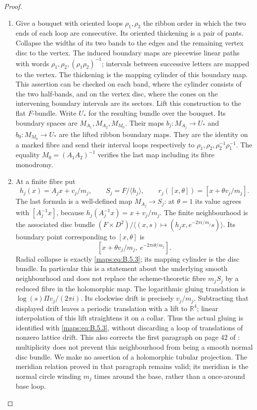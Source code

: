 \begin{proof}
\begin{enumerate}[label=\arabic*.,leftmargin=*]
\item Give a bouquet with oriented loops $\rho_1,\rho_2$ the ribbon
order in which the two ends of each loop are consecutive.
Its oriented thickening is a pair of pants.  Collapse the
widths of its two bands to the edges and the remaining
vertex disc to the vertex.  The induced boundary maps are
piecewise linear paths with words
$\rho_1,\rho_2,(\rho_1\rho_2)^{-1}$; intervals between
successive letters are mapped to the vertex.  The thickening
is the mapping cylinder of this boundary map.  This assertion
can be checked on each band, where the cylinder consists of
the two half-bands, and on the vertex disc, where the cones
on the intervening boundary intervals are its sectors.
Lift this construction to the flat $F$-bundle.  Write $U_*$
for the resulting bundle over the bouquet.  Its boundary
spaces are $M_{A_1},M_{A_2},M_{M_0}$.  Their maps
$b_j:M_{A_j}\to U_*$ and $b_0:M_{M_0}\to U_*$ are the
lifted ribbon boundary maps.  They are the identity on a
marked fibre and send their interval loops respectively to
$\rho_1,\rho_2,\rho_2^{-1}\rho_1^{-1}$.
The equality $M_0=(A_1A_2)^{-1}$ verifies the last map
including its fibre monodromy.

\item At a finite fibre put
\[
 h_j(x)=A_jx+v_j/m_j,\qquad S_j=F/\langle h_j\rangle,
 \qquad
 r_j([x,\theta])=[x+\theta v_j/m_j].
 \tag{B.5.3}\label{maps:eq:B.5.3}
\]
The last formula is a well-defined map $M_{A_j}\to S_j$:
at $\theta=1$ its value agrees with $[A_j^{-1}x]$, because
$h_j(A_j^{-1}x)=x+v_j/m_j$.  The finite neighbourhood is
the associated disc bundle
$(F\times D^2)/\langle(x,s)\mapsto(h_jx,e^{-2\pi i/m_j}s)\rangle$.
Its boundary point corresponding to $[x,\theta]$ is
\[
 [x+\theta v_j/m_j,\ e^{-2\pi i\theta/m_j}].
\]
Radial collapse is exactly \eqref{maps:eq:B.5.3}; its mapping cylinder is
the disc bundle.  In particular this is a statement about
the underlying smooth neighbourhood and does not replace
the scheme-theoretic fibre $m_jS_j$ by a reduced fibre in
the holomorphic map.  The logarithmic gluing translation is
$\log(s)\Pi v_j/(2\pi i)$.  Its clockwise drift is precisely
$v_j/m_j$.  Subtracting that displayed drift leaves a
periodic translation with a lift to $\mathbb R^4$; linear
interpolation of this lift straightens it on a collar.
Thus the actual gluing is identified with \eqref{maps:eq:B.5.3}, without
discarding a loop of translations of nonzero lattice drift.
This also corrects the first paragraph on page 42 of
\cite{mapsAC26}: multiplicity does not prevent this
neighbourhood from being a smooth normal disc bundle.
We make no assertion of a holomorphic tubular projection.
The meridian relation proved in that paragraph remains
valid; its meridian is the normal circle winding $m_j$
times around the base, rather than a once-around base
loop.


\end{enumerate}
\end{proof}
